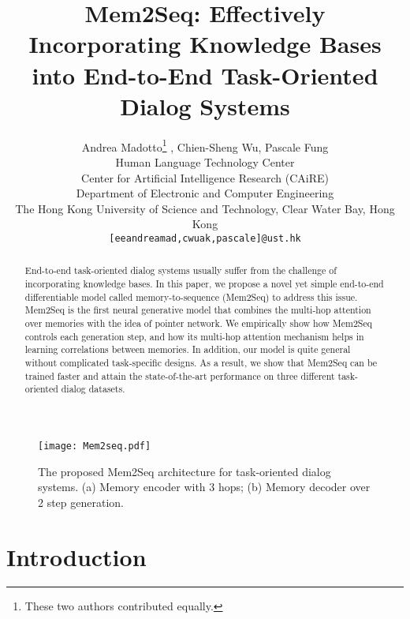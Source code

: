 \documentclass[11pt,a4paper]{article}
\title{Mem2Seq: Effectively Incorporating Knowledge Bases into End-to-End Task-Oriented Dialog Systems}
\author{Andrea Madotto\thanks{ These two authors contributed equally.} , Chien-Sheng Wu, Pascale Fung\\
  Human Language Technology Center \\
  Center for Artificial Intelligence Research (CAiRE) \\
  Department of Electronic and Computer Engineering \\
  The Hong Kong University of Science and Technology, Clear Water Bay, Hong Kong \\
  {\tt [eeandreamad,cwuak,pascale]@ust.hk} }
\date{}
\begin{document}
\maketitle
\begin{abstract}
End-to-end task-oriented dialog systems usually suffer from the challenge of incorporating knowledge bases. 
In this paper, we propose a novel yet simple end-to-end differentiable model called memory-to-sequence (Mem2Seq) to address this issue. Mem2Seq is the first neural generative model that combines the multi-hop attention over memories with the idea of pointer network. We empirically show how Mem2Seq controls each generation step, and how its multi-hop attention mechanism helps in learning correlations between memories. In addition, our model is quite general without complicated task-specific designs. As a result, we show that Mem2Seq can be trained faster and attain the state-of-the-art performance on three different task-oriented dialog datasets.
\end{abstract}

\begin{figure*}[t]
\centering
\texttt{[image: Mem2seq.pdf]}
\setlength{\abovecaptionskip}{-10pt} 
\caption{The proposed Mem2Seq architecture for task-oriented dialog systems. (a) Memory encoder with 3 hops; (b) Memory decoder over 2 step generation.}
\label{FIG:MODEL}
\end{figure*}

\section{Introduction}
\end{document}
